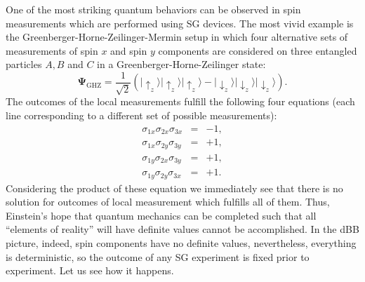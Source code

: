 \documentclass[preprint,tightenlines]{elsarticle}
\begin{document}
One of the most striking quantum behaviors can be observed in spin
measurements which are performed using SG devices. The
most vivid example is the Greenberger-Horne-Zeilinger-Mermin setup \cite{greenberger1989going,mermin1990quantum,greenberger1990bell}
in which four alternative sets of measurements of spin $x$ and spin
$y$ components are considered on three entangled particles $A,B$
and $C$ in a Greenberger-Horne-Zeilinger state:
\begin{equation}
\boldsymbol{\Psi}_{\mathrm{GHZ}}=\frac{1}{\sqrt{2}}\left(|\uparrow_{z}\rangle|\uparrow_{z}\rangle|\uparrow_{z}\rangle-|\downarrow_{z}\rangle|\downarrow_{z}\rangle|\downarrow_{z}\rangle\right).\end{equation}
 The outcomes of the local measurements fulfill the following four
equations (each line corresponding to a different set of possible
measurements):
\begin{eqnarray}
\sigma_{1x}\sigma_{2x}\sigma_{3x} & = & -1,\nonumber \\
\sigma_{1x}\sigma_{2y}\sigma_{3y} & = & +1,\\
\sigma_{1y}\sigma_{2x}\sigma_{3y} & = & +1,\nonumber \\
\sigma_{1y}\sigma_{2y}\sigma_{3x} & = & +1.\nonumber
\end{eqnarray}
 Considering the product of these equation we immediately see that
there is no solution for outcomes of local measurement which fulfills
all of them. Thus, Einstein's hope that quantum mechanics can be completed
such that all ``elements of reality'' will have definite values
cannot be accomplished. In the dBB picture, indeed, spin components
have no definite values, nevertheless, everything is deterministic,
so the outcome of any SG experiment is fixed prior to experiment.
Let us see how it happens.
\end{document}
